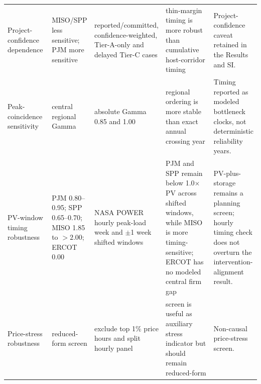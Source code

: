 \begin{table}[H]
{\begin{tabular}{L{0.19\linewidth}L{0.17\linewidth}L{0.24\linewidth}L{0.25\linewidth}L{0.25\linewidth}}
Project-confidence dependence & MISO/SPP less sensitive; PJM more sensitive & reported/committed, confidence-weighted, Tier-A-only and delayed Tier-C cases & thin-margin timing is more robust than cumulative host-corridor timing & Project-confidence caveat retained in the Results and SI. \\
Peak-coincidence sensitivity & central regional Gamma & absolute Gamma 0.85 and 1.00 & regional ordering is more stable than exact annual crossing year & Timing reported as modeled bottleneck clocks, not deterministic reliability years. \\
PV-window timing robustness & PJM 0.80--0.95; SPP 0.65--0.70; MISO 1.85 to \(>2.00\); ERCOT 0.00 & NASA POWER hourly peak-load week and \(\pm\)1 week shifted windows & PJM and SPP remain below 1.0\(\times\) PV across shifted windows, while MISO is more timing-sensitive; ERCOT has no modeled central firm gap & PV-plus-storage remains a planning screen; hourly timing check does not overturn the intervention-alignment result. \\
Price-stress robustness & reduced-form screen & exclude top 1\% price hours and split hourly panel & screen is useful as auxiliary stress indicator but should remain reduced-form & Non-causal price-stress screen. \\
\bottomrule
\end{tabular}%
}
\end{table}
\endgroup
